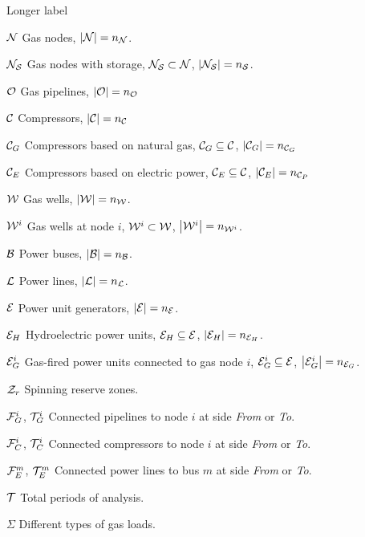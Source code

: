 \begin{labeling}{Longer label\quad}
\item [$\cal{N}$] Gas nodes, $\left| \cal{N} \right|= n_{\cal{N}}$.
\item [$\cal{N}_{S}$] Gas nodes with storage, $\cal{N}_{S} \subset \cal{N} $, $\left| \cal{N}_{S} \right|= n_{\cal{S}}$.
\item [${\cal{O}}$] Gas pipelines, $\left| \cal{O}  \right| = n_{\cal{O}}$
\item [${\cal{C}}$] Compressors, $\left| \cal{C}  \right| = n_{\cal{C}}$ 
\item [${\cal{C}}_{G}$] Compressors based on natural gas, ${\cal{C}}_{G} \subseteq {\cal{C}}$,   \hspace{5mm}   $\left| {\cal{C}}_{G}  \right| = n_{{\cal{C}}_{G}}$ 
\item [${\cal{C}}_{E}$] Compressors based on electric power, ${\cal{C}}_{E} \subseteq {\cal{C}}$,   \hspace{5mm}  $\left| {\cal{C}}_{E}  \right| = n_{{\cal{C}}_{P}}$ 
\item [${\cal{W}}$] Gas wells, $\left| \cal{W} \right|= n_{\cal{W}}$.
\item [${\cal{W}}^{i}$] Gas wells at node $i$, ${\cal{W}}^{i} \subset \cal{W} $, $\left| {\cal{W}}^{i} \right|= n_{{\cal{W}}^{i}}$.
\item [$\cal{B}$] Power buses, $\left| \cal{B} \right|= n_{\cal{B}}$.
\item [$\cal{L}$] Power lines, $\left| \cal{L} \right|= n_{\cal{L}}$.
\item [$\cal{E}$] Power unit generators, $\left| \cal{E} \right|= n_{\cal{E}}$.
\item [${\cal{E}}_{H}$] Hydroelectric power units, ${\cal{E}}_{H} \subseteq \cal{E} $, $\left| {\cal{E}}_{H} \right|= n_{{\cal{E}}_{H}}$.
\item [${\cal{E}}^{i}_{G}$] Gas-fired power units connected to gas node $i$, \break ${\cal{E}}^{i}_{G} \subseteq \cal{E}$, $\left| {\cal{E}}^{i}_{G} \right|= n_{{\cal{E}}_{G}}$.
\item [${\cal{Z}}_{r}$] Spinning reserve zones. 
\item [${\cal{F}}^{i}_{G}$, ${\cal{T}}^{i}_{G}$] Connected pipelines to node $i$ at side \textit{From} or \textit{To}.
\item [${\cal{F}}^{i}_{C}$, ${\cal{T}}^{i}_{C}$] Connected compressors to node $i$ at side \textit{From} or \textit{To}.
\item [${\cal{F}}^{m}_{E}$, ${\cal{T}}^{m}_{E}$] Connected power lines to bus $m$ at side \textit{From} or \textit{To}. 
\item [$\cal{T}$] Total periods of analysis.
\item [$\Sigma$] Different types of gas loads.
\end{labeling}

